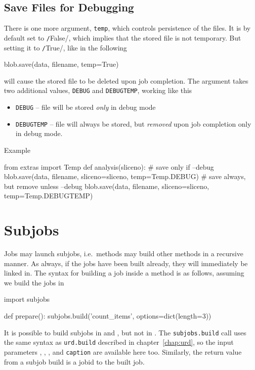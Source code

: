 \subsection*{Save Files for Debugging}
There is one more argument, \texttt{temp}, which controls persistence
of the files.  It is by default set to \texttt/False/,
which implies that the stored file is not temporary.  But setting it
to \texttt/True/, like in the following
\begin{python}
    blob.save(data, filename, temp=True)
\end{python}
will cause the stored file to be deleted upon job completion.  The
argument takes two additional values, \texttt{DEBUG} and
\texttt{DEBUGTEMP}, working like this
\begin{itemize}
\item[] \texttt{DEBUG} -- file will be stored \emph{only} in debug
  mode
\item[] \texttt{DEBUGTEMP} -- file will always be stored, but
  \emph{removed} upon job completion only in debug mode.
\end{itemize}
Example
\begin{python}
from extras import Temp
def analysis(sliceno):
  # save only if --debug
  blob.save(data, filename, sliceno=sliceno, temp=Temp.DEBUG)
  # save always, but remove unless --debug
  blob.save(data, filename, sliceno=sliceno, temp=Temp.DEBUGTEMP)
\end{python}


\clearpage
\section{Subjobs}

Jobs may launch subjobs, i.e.\ methods may build other methods in a
recursive manner.  As always, if the jobs have been built already,
they will immediately be linked in.  The syntax for building a job
inside a method is as follows, assuming we build the jobs in \prepare
\begin{python}
import subjobs

def prepare():
  subjobs.build('count_items', options=dict(length=3))
\end{python}
It is possible to build subjobs in \prepare and \synthesis, but not in
\analysis.    The \texttt{subjobs.build} call uses the
same syntax as \texttt{urd.build} described in chapter~\ref{chap:urd}, so
the input parameters \options, \datasets, \jobids, and
\texttt{caption} are available here too.  Similarly, the return value
from a subjob build is a jobid to the built job.

